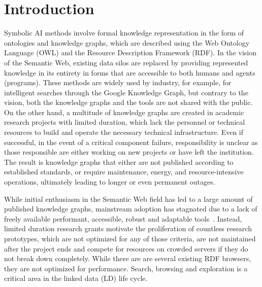 \documentclass{ceurart}
\begin{document}
\section{Introduction}\label{summary}
Symbolic AI methods involve formal knowledge representation in the form of ontologies and knowledge graphs, which are described using the Web Ontology Language (OWL) and the Resource Description Framework (RDF). In the vision of the Semantic Web, existing data silos are replaced by providing represented knowledge in its entirety in forms that are accessible to both humans and agents (programs).
These methods are widely used by industry, for example, for intelligent searches through the Google Knowledge Graph, but contrary to the vision, both the knowledge graphs and the tools are not shared with the public.
On the other hand, a multitude of knowledge graphs are created in academic research projects with limited duration, which lack the personnel or technical resources to build and operate the necessary technical infrastructure. Even if successful, in the event of a critical component failure, responsibility is unclear as those responsible are either working on new projects or have left the institution.
The result is knowledge graphs that either are not published according to established standards, or require maintenance, energy, and resource-intensive operations, ultimately leading to longer or even permanent outages.

While initial enthusiasm in the Semantic Web field has led to a large amount of published knowledge graphs, mainstream adoption has stagnated due to a lack of freely available performant, accessible, robust and adaptable tools~\citep{semanticwebreview}.
Instead, limited duration research grants motivate the proliferation of countless research prototypes, which are not optimized for any of those criteria, are not maintained after the project ends and compete for resources on crowded servers if they do not break down completely.
While there are are several existing RDF browsers, they are not optimized for performance.
Search, browsing and exploration is a critical area in the linked data (LD) life cycle.
\end{document}
